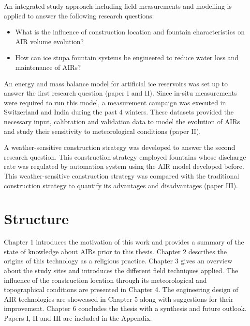 An integrated study approach including field measurements and modelling is applied to
answer the following research questions: 

\begin{itemize}

\item What is the influence of construction location and fountain characteristics on AIR volume evolution? 

\item How can ice stupa fountain systems be engineered to reduce water loss and maintenance of AIRs?

\end{itemize}

An energy and mass balance model for artificial ice reservoirs was set up to answer the first research question
(paper I and II). Since in-situ measurements were required to run this model, a measurement campaign was
executed in Switzerland and India during the past 4 winters. These datasets provided the necessary input,
calibration and validation data to model the evolution of AIRs and study their sensitivity to meteorological
conditions (paper II). 

A weather-sensitive construction strategy was developed to answer the second research question. This
construction strategy employed fountains whose discharge rate was regulated by automation system using the AIR
model developed before. This weather-sensitive construction strategy was compared with the traditional
construction strategy to quantify its advantages and disadvantages (paper III).

\section{Structure}

Chapter 1 introduces the motivation of this work and provides a summary of the state of knowledge about AIRs
prior to this thesis. Chapter 2 describes the origins of this technology as a religious practice. Chapter 3
gives an overview about the study sites and introduces the different field techniques applied. The influence of
the construction location through its meteorological and topographical conditions are presented in Chapter 4.
The engineering design of AIR technologies are showcased in Chapter 5 along with suggestions for their
improvement. Chapter 6 concludes the thesis with a synthesis and future outlook. Papers I, II and III are
included in the Appendix.


